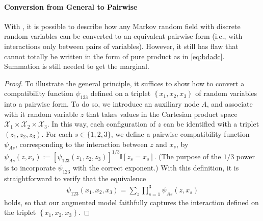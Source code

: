 \documentclass{article}
\begin{document}
\paragraph{Conversion from General to Pairwise}\label{sec:con_gen_pair}
With , it is possible to describe how any Markov random field with discrete random variables can be converted to an equivalent pairwise form (i.e., with interactions only between pairs of variables). However, it still has flaw that cannot totally be written in the form of pure product as in \cref{eq:bdadc}. Summation is still needed to get the marginal.
\begin{proof}
To illustrate the general principle, it suffices to show how to convert a compatibility function $\psi_{123}$ defined on a triplet $\left\{x_{1}, x_{2}, x_{3}\right\}$ of random variables into a pairwise form. To do so, we introduce an auxiliary node $A$, and associate with it random variable $z$ that takes values in the Cartesian product space $\mathcal{X}_{1} \times \mathcal{X}_{2} \times \mathcal{X}_{3} .$ In this way, each configuration of $z$ can be identified with a triplet $\left(z_{1}, z_{2}, z_{3}\right)$. For each $s \in\{1,2,3\}$, we define a pairwise compatibility function $\psi_{A s}$, corresponding to the interaction between $z$ and $x_{s}$, by $\psi_{A s}\left(z, x_{s}\right):=\left[\psi_{123}\left(z_{1}, z_{2}, z_{3}\right)\right]^{1 / 3} \mathbb{I}\left[z_{s}=x_{s}\right] .$ (The purpose of the $1 / 3$ power is to incorporate $\psi_{123}$ with the correct exponent.) With this definition, it is straightforward to verify that the equivalence
\begin{align}
\psi_{123}\left(x_{1}, x_{2}, x_{3}\right)=\sum_{z} \prod_{s=1}^{3} \psi_{A s}\left(z, x_{s}\right)\label{eq:}
\end{align}
holds, so that our augmented model faithfully captures the interaction defined on the triplet $\left\{x_{1}, x_{2}, x_{3}\right\}$.
\end{proof}
\end{document}
